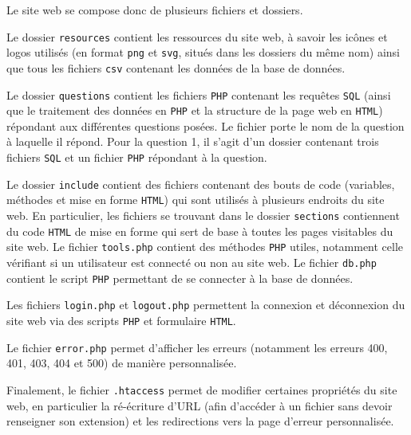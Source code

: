 \documentclass[a4paper, 12pt]{article}
\begin{document}
	Le site web se compose donc de plusieurs fichiers et dossiers.\par
	Le dossier \texttt{resources} contient les ressources du site web, à savoir les icônes et logos utilisés (en format \texttt{png} et \texttt{svg}, situés dans les dossiers du même nom) ainsi que tous les fichiers \texttt{csv} contenant les données de la base de données.\par
	Le dossier \texttt{questions} contient les fichiers \texttt{PHP} contenant les requêtes \texttt{SQL} (ainsi que le traitement des données en \texttt{PHP} et la structure de la page web en \texttt{HTML}) répondant aux différentes questions posées. Le fichier porte le nom de la question à laquelle il répond. Pour la question 1, il s'agit d'un dossier contenant trois fichiers \texttt{SQL} et un fichier \texttt{PHP} répondant à la question.\par
	Le dossier \texttt{include} contient des fichiers contenant des bouts de code (variables, méthodes et mise en forme \texttt{HTML}) qui sont utilisés à plusieurs endroits du site web. En particulier, les fichiers se trouvant dans le dossier \texttt{sections} contiennent du code \texttt{HTML} de mise en forme qui sert de base à toutes les pages visitables du site web. Le fichier \texttt{tools.php} contient des méthodes \texttt{PHP} utiles, notamment celle vérifiant si un utilisateur est connecté ou non au site web. Le fichier \texttt{db.php} contient le script \texttt{PHP} permettant de se connecter à la base de données.\par
	Les fichiers \texttt{login.php} et \texttt{logout.php} permettent la connexion et déconnexion du site web via des scripts \texttt{PHP} et formulaire \texttt{HTML}.\par
	Le fichier \texttt{error.php} permet d'afficher les erreurs (notamment les erreurs 400, 401, 403, 404 et 500) de manière personnalisée.\par
	Finalement, le fichier \texttt{.htaccess} permet de modifier certaines propriétés du site web, en particulier la ré-écriture d'URL (afin d'accéder à un fichier sans devoir renseigner son extension) et les redirections vers la page d'erreur personnalisée.
\end{document}
